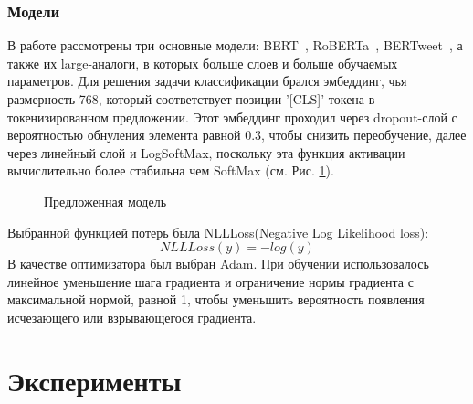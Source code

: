 \documentclass{article}
\begin{document}
\subsubsection{Модели}
В работе рассмотрены три основные модели: BERT~\cite{devlin}, RoBERTa~\cite{roberta}, BERTweet~\cite{bertweet}, а также их large-аналоги, в которых больше слоев и больше обучаемых параметров. Для решения задачи классификации брался  эмбеддинг, чья размерность 768, который соответствует позиции '[CLS]' токена в токенизированном предложении. Этот эмбеддинг проходил через dropout-слой с вероятностью обнуления элемента равной 0.3, чтобы снизить переобучение, далее через линейный слой и LogSoftMax, поскольку эта функция активации вычислительно более стабильна чем SoftMax (см. Рис. \ref{eq:proposed_model}).
\begin{figure}[h!]
	\caption{\centering Предложенная модель}
	\label{eq:proposed_model}
\end{figure}
Выбранной функцией потерь была NLLLoss(Negative Log Likelihood loss):
$$
NLLLoss(y) = - log(y)
$$
В качестве оптимизатора был выбран Adam. При обучении использовалось линейное уменьшение шага градиента и  ограничение нормы градиента с максимальной нормой, равной 1, чтобы уменьшить вероятность появления исчезающего или взрывающегося градиента.

\section{Эксперименты}
\end{document}
